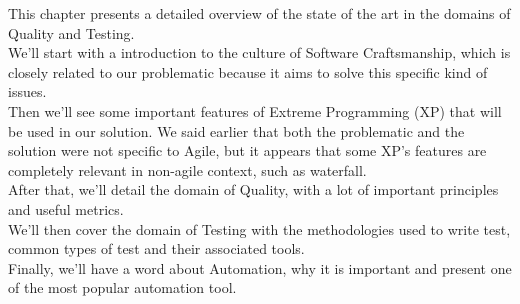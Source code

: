 This chapter presents a detailed overview of the state of the art in the
domains of Quality and Testing. \\
We'll start with a introduction to the culture of Software Craftsmanship,
which is closely related to our problematic because it aims to solve this
specific kind of issues.  \\
Then we'll see some important features of Extreme Programming (XP) that
will be used in our solution.
We said earlier that both the problematic and the solution were not
specific to Agile, but it appears that some XP's features are completely
relevant in non-agile context, such as waterfall. \\
After that, we'll detail the domain of Quality, with a lot of important
principles and useful metrics. \\
We'll then cover the domain of Testing with the methodologies used to
write test, common types of test and their associated tools. \\
Finally, we'll have a word about Automation, why it is important and
present one of the most popular automation tool.










